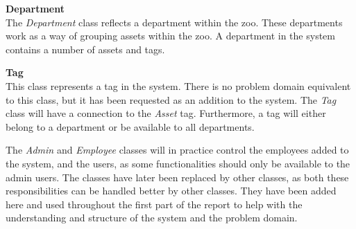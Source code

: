\textbf{Department}\\
The \textit{Department} class reflects a department within the zoo. These departments work as a way of grouping assets within the zoo. A department in the system contains a number of assets and tags.
\par

\textbf{Tag}\\
This class represents a tag in the system. There is no problem domain equivalent to this class, but it has been requested as an addition to the system. The \textit{Tag} class will have a connection to the \textit{Asset} tag. Furthermore, a tag will either belong to a department or be available to all departments.
\newline

The \textit{Admin} and \textit{Employee} classes will in practice control the employees added to the system, and the users, as some functionalities should only be available to the admin users. The classes have later been replaced by other classes, as both these responsibilities can be handled better by other classes. They have been added here and used throughout the first part of the report to help with the understanding and structure of the system and the problem domain.